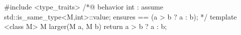 \begin{example}

\begin{listing-nonumber}
#include <type_traits>
/*@ behavior int :
       assume std::is_same_type<M,int>::value;
       ensures \result == (a > b ? a : b);
 */
template <class M>
M larger(M a, M b) {
  return a > b ? a : b;
}
\end{listing-nonumber}

\end{example}


